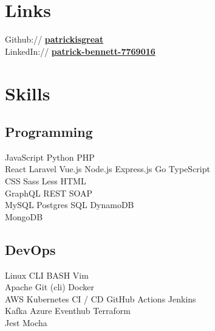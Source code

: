 \documentclass[]{pb-resume}
\begin{document}
%
%
\lastupdated

%
%

%
%

\begin{minipage}[t]{0.33\textwidth} 


\section{Links} 
Github:// \href{https://github.com/patrickisgreat}{\bf patrickisgreat} \\
LinkedIn://  \href{https://www.linkedin.com/in/patrick-bennett-7769016}{\bf patrick-bennett-7769016} \\


\section{Skills}
\subsection{Programming}
JavaScript \textbullet{}  Python \textbullet{}  PHP \textbullet{}  \\
React \textbullet{}  Laravel \textbullet{}  Vue.js \textbullet{} 
Node.js \textbullet{}  Express.js \textbullet{} Go \textbullet{} TypeScript \\
CSS \textbullet{} Sass \textbullet{} Less \textbullet{} HTML \\
GraphQL \textbullet{} REST \textbullet{}  SOAP \\
MySQL \textbullet{} Postgres \textbullet{} SQL \textbullet{} DynamoDB \\
MongoDB
\sectionsep


\subsection{DevOps}
Linux CLI \textbullet{}  BASH \textbullet{}  Vim \\
Apache \textbullet{} Git (cli) \textbullet{} Docker \\
AWS \textbullet{} Kubernetes \textbullet{} CI / CD \textbullet{} GitHub Actions \textbullet{} Jenkins \\
Kafka \textbullet{} Azure Eventhub \textbullet{} Terraform \\
Jest \textbullet{} Mocha \\
\sectionsep


\end{minipage}
\end{document}
